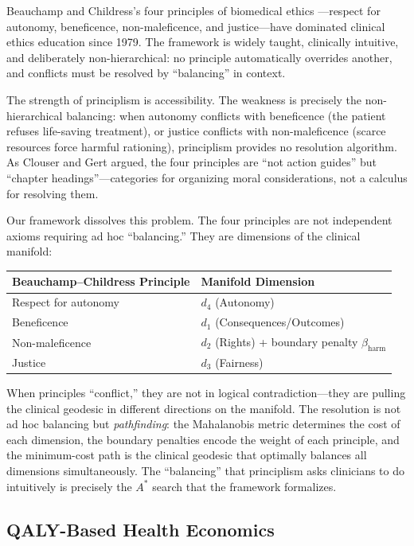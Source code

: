 \documentclass[12pt]{article}
\theoremstyle{definition}
\theoremstyle{remark}
\begin{document}
Beauchamp and Childress's four principles of biomedical ethics \cite{beauchamp2019}---respect for autonomy, beneficence, non-maleficence, and justice---have dominated clinical ethics education since 1979.  The framework is widely taught, clinically intuitive, and deliberately non-hierarchical: no principle automatically overrides another, and conflicts must be resolved by ``balancing'' in context.

The strength of principlism is accessibility.  The weakness is precisely the non-hierarchical balancing: when autonomy conflicts with beneficence (the patient refuses life-saving treatment), or justice conflicts with non-maleficence (scarce resources force harmful rationing), principlism provides no resolution algorithm.  As Clouser and Gert \cite{clouser1990} argued, the four principles are ``not action guides'' but ``chapter headings''---categories for organizing moral considerations, not a calculus for resolving them.

Our framework dissolves this problem.  The four principles are not independent axioms requiring ad hoc ``balancing.''  They are dimensions of the clinical manifold:

\begin{center}
\begin{tabular}{ll}
\toprule
\textbf{Beauchamp--Childress Principle} & \textbf{Manifold Dimension} \\
\midrule
Respect for autonomy & $d_4$ (Autonomy) \\
Beneficence & $d_1$ (Consequences/Outcomes) \\
Non-maleficence & $d_2$ (Rights) + boundary penalty $\beta_{\text{harm}}$ \\
Justice & $d_3$ (Fairness) \\
\bottomrule
\end{tabular}
\end{center}

When principles ``conflict,'' they are not in logical contradiction---they are pulling the clinical geodesic in different directions on the manifold.  The resolution is not ad hoc balancing but \emph{pathfinding}: the Mahalanobis metric determines the cost of each dimension, the boundary penalties encode the weight of each principle, and the minimum-cost path is the clinical geodesic that optimally balances all dimensions simultaneously.  The ``balancing'' that principlism asks clinicians to do intuitively is precisely the $A^*$ search that the framework formalizes.

\subsection{QALY-Based Health Economics}
\end{document}
